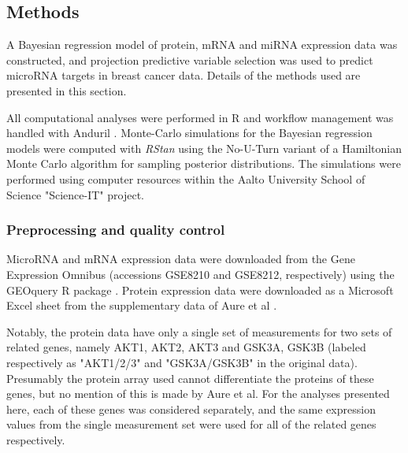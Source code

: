 





\subsection{Methods}

A Bayesian regression model of protein, mRNA and miRNA expression data was
constructed, and projection predictive variable selection was used to predict
microRNA targets in breast cancer data. Details of the methods used are
presented in this section.

All computational analyses were performed in R
\citep{R} and workflow management was handled with Anduril \citep{Ovaska2010}.
Monte-Carlo simulations for the Bayesian regression models were computed with
\emph{RStan} \citep{RStan} using the No-U-Turn variant of a Hamiltonian Monte Carlo
algorithm for sampling posterior distributions. The simulations were performed using
computer resources within the Aalto University School of Science "Science-IT"
project.


\subsubsection{Preprocessing and quality control}

MicroRNA and mRNA expression data were downloaded from the Gene Expression
Omnibus \citep{Edgar2002} (accessions GSE8210 and GSE8212, respectively) using
the GEOquery R package \citep{GEOquery}. Protein expression data were
downloaded as a Microsoft Excel sheet from the supplementary data of Aure et
al \citep{Aure2015}.

Notably, the protein data have only a single set of measurements for two sets
of related genes, namely AKT1, AKT2, AKT3 and GSK3A, GSK3B (labeled
respectively as "AKT1/2/3" and "GSK3A/GSK3B" in the original data). Presumably
the protein array used cannot differentiate the proteins of these genes, but
no mention of this is made by Aure et al. For the analyses presented here,
each of these genes was considered separately, and the same expression values
from the single measurement set were used for all of the related genes
respectively.

